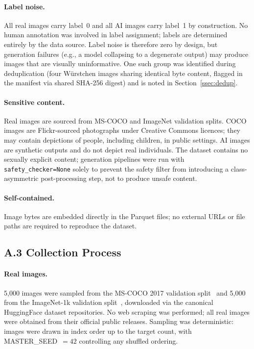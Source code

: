 \paragraph{Label noise.}
All real images carry label~0 and all AI images carry label~1 by
construction.
No human annotation was involved in label assignment; labels are
determined entirely by the data source.
Label noise is therefore zero by design, but generation failures
(e.g., a model collapsing to a degenerate output) may produce
images that are visually uninformative.
One such group was identified during deduplication (four W\"{u}rstchen
images sharing identical byte content, flagged in the manifest via
shared SHA-256 digest) and is noted in Section~\ref{ssec:dedup}.

\paragraph{Sensitive content.}
Real images are sourced from MS-COCO and ImageNet validation splits.
COCO images are Flickr-sourced photographs under Creative Commons
licences; they may contain depictions of people, including children,
in public settings.
AI images are synthetic outputs and do not depict real individuals.
The dataset contains no sexually explicit content; generation
pipelines were run with \texttt{safety\_checker=None} solely to
prevent the safety filter from introducing a class-asymmetric
post-processing step, not to produce unsafe content.

\paragraph{Self-contained.}
Image bytes are embedded directly in the Parquet files; no external
URLs or file paths are required to reproduce the dataset.

\subsection*{A.3 \quad Collection Process}
\label{ssec:ds_collection}

\paragraph{Real images.}
5,000 images were sampled from the MS-COCO 2017 validation
split~\cite{lin2014coco} and 5,000 from the ImageNet-1k validation
split~\cite{deng2009imagenet}, downloaded via the canonical
HuggingFace dataset repositories.
No web scraping was performed; all real images were obtained from
their official public releases.
Sampling was deterministic: images were drawn in index order up to
the target count, with MASTER\_SEED~$= 42$ controlling any shuffled
ordering.

